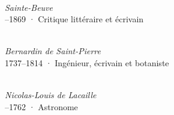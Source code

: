 \begin{minipage}[t][\textheight][s]{\textwidth}
\begin{center}
  \begin{minipage}[t]{0.32\textwidth}
    \centering
    \\
    {\figcaptionname\itshape Sainte-Beuve }\\
    {--1869 ·  Critique littéraire et écrivain}
  \end{minipage}
  \hfill
  \begin{minipage}[t]{0.32\textwidth}
    \centering
    \\
    {\figcaptionname\itshape Bernardin de Saint-Pierre }\\
    {\figcaptiondetail\lineskiplimit=-3pt 1737--1814 · Ingénieur, écrivain et botaniste}
  \end{minipage}
  \hfill
  \begin{minipage}[t]{0.32\textwidth}
    \centering
    \\
    {\figcaptionname\itshape Nicolas-Louis de Lacaille }\\
    {--1762 · Astronome}
  \end{minipage}

\end{center}
\vspace*{\fill}
\end{minipage}
